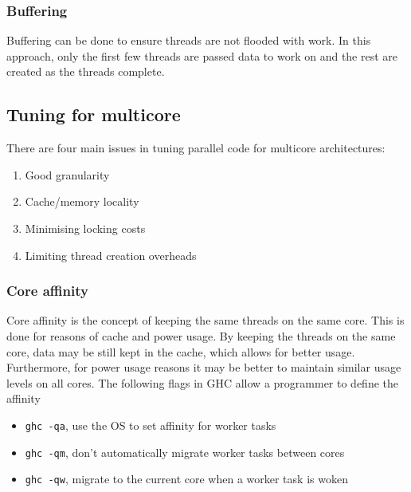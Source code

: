 \documentclass[CS4204-Notes.tex]{subfiles}
\begin{document}
\subsubsection{Buffering}
Buffering can be done to ensure threads are not flooded with work. In this approach, only the first few threads are passed data to work on and the rest are created as the threads complete. 


\subsection{Tuning for multicore}
There are four main issues in tuning parallel code for multicore architectures:
\begin{enumerate}
\item Good granularity
\item Cache/memory locality
\item Minimising locking costs
\item Limiting thread creation overheads
\end{enumerate}

\subsubsection{Core affinity}
Core affinity is the concept of keeping the same threads on the same core. This is done for reasons of cache and power usage. By keeping the threads on the same core, data may be still kept in the cache, which allows for better usage. Furthermore, for power usage reasons it may be better to maintain similar usage levels on all cores.
The following flags in GHC allow a programmer to define the affinity
\begin{itemize}
\item \texttt{ghc -qa}, use the OS to set affinity for worker tasks
\item \texttt{ghc -qm}, don't automatically migrate worker tasks between cores
\item \texttt{ghc -qw}, migrate to the current core when a worker task is woken
\end{itemize}
\end{document}
